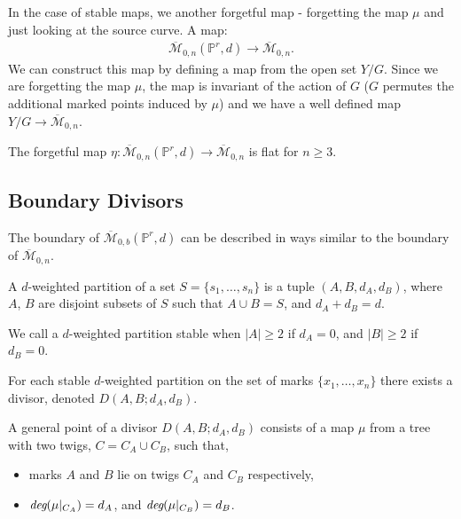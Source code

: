 \par In the case of stable maps, we another forgetful map - forgetting the map $\mu$ and just looking at the source curve. 
A map:
\begin{align*}
    \overline{\mathcal{M}}_{0,n}(\mathbb{P}^{r},d) \to \overline{\mathcal{M}}_{0,n}.
\end{align*}
We can construct this map by defining a map from the open set $Y/G$. 
Since we are forgetting the map $\mu$, the map is invariant of the action of $G$ ($G$ permutes the additional marked points induced by $\mu$) and we have a well defined map $Y/G \to \overline{\mathcal{M}}_{0,n}$.

\begin{lemma}
    The forgetful map $\eta : \overline{\mathcal{M}}_{0,n}(\mathbb{P}^{r},d) \to \overline{\mathcal{M}}_{0,n}$ is flat for $n \geq 3$.
\end{lemma}

\subsection{Boundary Divisors}

The boundary of $\mathcal{\overline{M}}_{0,b}(\mathbb{P}^{r},d)$ can be described in ways similar to the boundary of $\overline{\mathcal{M}}_{0,n}$.

\begin{definition}
    A $d$-weighted partition of a set $S = \{s_{1},\dots,s_{n}\}$ is a tuple $(A,B,d_{A},d_{B})$, where $A$, $B$ are disjoint subsets of $S$ such that $A \cup B = S$, and $d_{A} + d_{B} = d$.
    \par We call a $d$-weighted partition stable when $|A|\geq 2$ if $d_{A} = 0$, and $|B|\geq 2$ if $d_{B} = 0$.
\end{definition}


\begin{definition}
For each stable $d$-weighted partition on the set of marks $\{x_{1},\dots,x_{n}\}$ there exists a divisor, denoted $D(A,B;d_{A}, d_{B})$.
\par A general point of a divisor $D(A,B;d_{A}, d_{B})$ consists of a map $\mu$ from a tree with two twigs, $C = C_{A} \cup C_{B}$, such that,
\begin{itemize}
    \item marks $A$ and $B$ lie on twigs $C_{A}$ and $C_{B}$ respectively,
    \item $\emph{deg}(\mu|_{C_{A}}) = d_{A}$, and $\emph{deg}(\mu|_{C_{B}}) = d_{B}$.
\end{itemize}
\end{definition}

